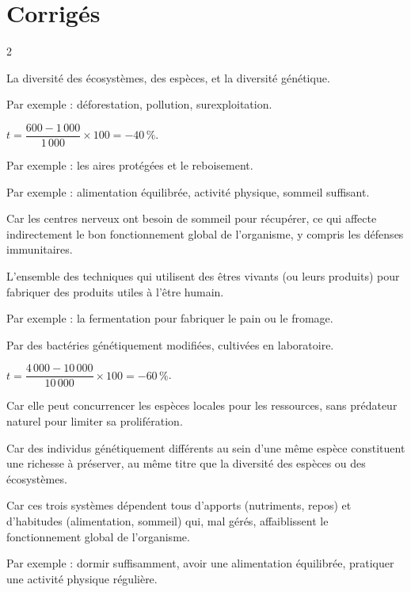 \section{Corrigés}
\begin{multicols}{2}

La diversité des écosystèmes, des espèces, et la diversité génétique.

Par exemple : déforestation, pollution, surexploitation.

$t=\dfrac{600-1\,000}{1\,000}\times100=-40\,\%$.

Par exemple : les aires protégées et le reboisement.

Par exemple : alimentation équilibrée, activité physique, sommeil suffisant.

Car les centres nerveux ont besoin de sommeil pour récupérer, ce qui affecte
indirectement le bon fonctionnement global de l'organisme, y compris les défenses
immunitaires.

L'ensemble des techniques qui utilisent des êtres vivants (ou leurs produits) pour
fabriquer des produits utiles à l'être humain.

Par exemple : la fermentation pour fabriquer le pain ou le fromage.

Par des bactéries génétiquement modifiées, cultivées en laboratoire.

$t=\dfrac{4\,000-10\,000}{10\,000}\times100=-60\,\%$.

Car elle peut concurrencer les espèces locales pour les ressources, sans prédateur
naturel pour limiter sa prolifération.

Car des individus génétiquement différents au sein d'une même espèce constituent une
richesse à préserver, au même titre que la diversité des espèces ou des écosystèmes.

Car ces trois systèmes dépendent tous d'apports (nutriments, repos) et d'habitudes
(alimentation, sommeil) qui, mal gérés, affaiblissent le fonctionnement global de
l'organisme.

Par exemple : dormir suffisamment, avoir une alimentation équilibrée, pratiquer une
activité physique régulière.


\end{multicols}
